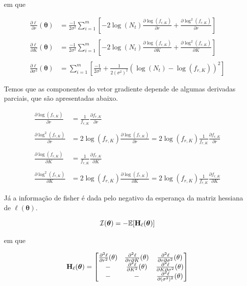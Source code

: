 \documentclass[a4paper,12pt,twoside]{article}
\begin{document}
em que

\begin{align*}
\frac{\partial \ell}{\partial r}(\bm{\theta})&=\frac{-1}{2\sigma^2}\sum_{i=1}^{m}\left[-2\log(N_t)\frac{\partial \log(f_{r,K})}{\partial r} + \frac{\partial \log^{2}(f_{r,K})}{\partial r} \right]\\\\
\frac{\partial \ell}{\partial K}(\bm{\theta})&=\frac{-1}{2\sigma^2}\sum_{i=1}^{m}\left[-2\log(N_t)\frac{\partial \log(f_{r,K})}{\partial K} + \frac{\partial \log^{2}(f_{r,K})}{\partial K} \right]\\\\
\frac{\partial \ell}{\partial \sigma^2}(\bm{\theta})&=\sum_{i=1}^{m}\left[\frac{-1}{2\sigma^2} + \frac{1}{2(\sigma^2)^2} (\log(N_t)-\log(f_{r,K}))^2 \right]
\end{align*}

Temos que as componentes do vetor gradiente depende de algumas derivadas parciais, que são apresentadas abaixo.

\begin{align*}
\frac{\partial \log(f_{r,K})}{\partial r}&=\frac{1}{f_{r,K}}\frac{\partial f_{r,K}}{\partial r}\\\\
\frac{\partial \log^{2}(f_{r,K})}{\partial r}&=2\log(f_{r,K})\frac{\partial \log(f_{r,K})}{\partial r}=2\log(f_{r,K})\frac{1}{f_{r,K}}\frac{\partial f_{r,K}}{\partial r}\\\\
\frac{\partial \log(f_{r,K})}{\partial K}&=\frac{1}{f_{r,K}}\frac{\partial f_{r,K}}{\partial K}\\\\
\frac{\partial \log^{2}(f_{r,K})}{\partial K}&=2\log(f_{r,K})\frac{\partial \log(f_{r,K})}{\partial K}=2\log(f_{r,K})\frac{1}{f_{r,K}}\frac{\partial f_{r,K}}{\partial K}
\end{align*}

Já a informação de fisher é dada pelo negativo da esperança da matriz hessiana de $\ell(\bm{\theta})$.

\begin{equation}
\mathcal{I}(\bm{\theta})=-\mathbb{E}[\bf{H_{\ell}(\bm{\theta})}]
\end{equation}

em que 

\begin{equation}
\bf{H}_{\ell}(\bm{\theta})=\begin{bmatrix}
\frac{\partial^2\ell }{\partial r^2}(\bf{\theta}) &\frac{\partial^2\ell }{\partial r\partial K}(\bf{\theta})  & \frac{\partial^2\ell }{\partial r\partial \sigma^2}(\bf{\theta}) \\ 
- & \frac{\partial^2\ell }{\partial K^2}(\bf{\theta}) &\frac{\partial^2\ell }{\partial K\partial \sigma^2}(\bf{\theta})  \\ 
- & - & \frac{\partial^2\ell }{\partial (\sigma^2)^2}(\bf{\theta})
\end{bmatrix}
\end{equation}
\newpage
\end{document}
